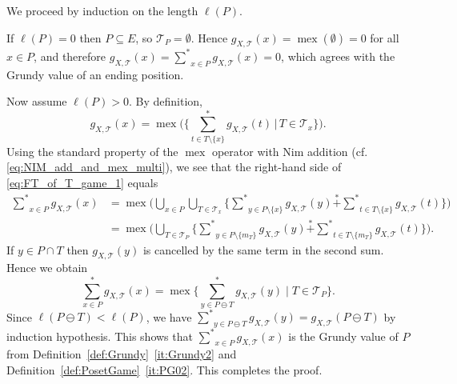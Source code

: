 \documentclass[a4paper,11pt]{amsart}
\theoremstyle{definition}
\newenvironment{demo}[1]{%
  \trivlist
  \item[\hskip\labelsep
        {\bf #1.}]
}{%
\hfill\qedsymbol
  \endtrivlist
}
\newcommand{\mex}{\operatorname{mex}}
\newcommand{\nimadd}{\overset{*}{+}}
\newcommand{\nimsum}{{\sum}^{*}}
\numberwithin{equation}{section}
\def\T{\mathscr{T}}
\begin{document}
\begin{demo}{Proof}
%
We proceed by induction on the length $\ell(P)$.
%
\par\smallskip
%
If $\ell(P)=0$ then $P\subseteq E$, so $\T_{P}=\emptyset$.
%
Hence $g_{X,\T}(x)=\mex(\emptyset)=0$ for all $x\in P$,
and therefore $g_{X,\T}(x)=\underset{x \in P}{\nimsum}g_{X,\T}(x)=0$, 
which agrees with the Grundy value of an ending position.
%
\par\smallskip
%
Now assume $\ell(P)>0$.
By definition,
\[
g_{X,\T}(x)=\mex\biggl(\biggl\{\underset{t\in T\setminus\{x\}}{\nimsum}g_{X,\T}(t) \,\bigg|\, T\in \T_{x}\biggr\}\biggr).
\]
Using the standard property of the $\mex$ operator with Nim addition
(cf. \eqref{eq:NIM_add_and_mex_multi}),
we see that the right-hand side of \eqref{eq:FT_of_T_game_1} equals
%
\begin{align*}
%
\underset{x \in P}{\nimsum} g_{X,\T}(x)
%
&=\mex\biggl(
\bigcup_{x \in P}
\bigcup_{T\in\T_{x}}
\biggl\{
\underset{y\in P\setminus \{x\}}{\nimsum} g_{X,\T}(y)\nimadd \underset{t\in T\setminus\{x\}}{\nimsum}g_{X,\T}(t)
\biggr\}
\biggr)
%
\\
%
&=\mex\biggl(
\bigcup_{T\in\T_{P}}
\biggl\{
\underset{y\in P\setminus \{m_{T}\}}{\nimsum} g_{X,\T}(y)\nimadd \underset{t\in T\setminus\{m_{T}\}}{\nimsum}g_{X,\T}(t)
\biggr\}
\biggr).
%
\end{align*}
%
If $y \in P\cap T$ then $g_{X,\T}(y)$ is cancelled by the same term in the second sum.
Hence we obtain
\[
\underset{x \in P}{\nimsum} g_{X,\T}(x)
=\mex\biggl\{\underset{y\in P\ominus T}{\nimsum} g_{X,\T}(y)
\mid T\in \T_{P}
\biggr\}.
\]
Since $\ell(P\ominus T)<\ell(P)$,
we have 
$\underset{y\in P\ominus T}{\nimsum} g_{X,\T}(y)=g_{X,\T}(P\ominus T)$
by induction hypothesis.
This shows that $\underset{x \in P}{\nimsum} g_{X,\T}(x)$ is the Grundy value of $P$
from Definition~\ref{def:Grundy}~\ref{it:Grundy2} and Definition~\ref{def:PosetGame}~\ref{it:PG02}.
This completes the proof.
%
\end{demo}
%
\end{document}
